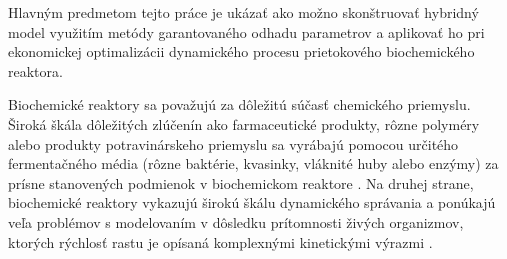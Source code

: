 Hlavným predmetom tejto práce je ukázať ako možno skonštruovať hybridný model využitím metódy garantovaného odhadu parametrov a aplikovať ho pri ekonomickej optimalizácii dynamického procesu prietokového biochemického reaktora.

Biochemické reaktory sa považujú za dôležitú súčasť chemického priemyslu. Široká škála dôležitých zlúčenín ako farmaceutické produkty, rôzne polyméry alebo produkty potravinárskeho priemyslu sa vyrábajú pomocou určitého fermentačného média (rôzne baktérie, kvasinky, vláknité huby alebo enzýmy) za prísne stanovených podmienok v biochemickom reaktore \cite{srinivasan:chemostat_opt:2003}. Na druhej strane, biochemické reaktory vykazujú širokú škálu dynamického správania a ponúkajú veľa problémov s modelovaním v dôsledku prítomnosti živých organizmov, ktorých rýchlosť rastu je opísaná komplexnými kinetickými výrazmi \cite{psichogios:hybrid_process_model:1992}.
